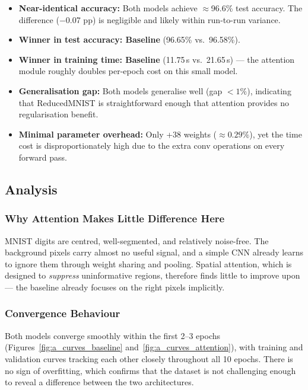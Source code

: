\documentclass[12pt,a4paper]{article}
\begin{document}
\begin{itemize}[leftmargin=1.5em]
    \item \textbf{Near-identical accuracy:} Both models achieve $\approx$96.6\%
          test accuracy. The difference ($-$0.07 pp) is negligible and likely within
          run-to-run variance.
    \item \textbf{Winner in test accuracy: Baseline} (96.65\% vs.\ 96.58\%).
    \item \textbf{Winner in training time: Baseline} (11.75\,s vs.\ 21.65\,s) —
          the attention module roughly doubles per-epoch cost on this small model.
    \item \textbf{Generalisation gap:} Both models generalise well (gap $<1\%$),
          indicating that ReducedMNIST is straightforward enough that attention
          provides no regularisation benefit.
    \item \textbf{Minimal parameter overhead:} Only +38 weights ($\approx0.29\%$),
          yet the time cost is disproportionately high due to the extra conv operations
          on every forward pass.
\end{itemize}

\subsection{Analysis}

\subsubsection{Why Attention Makes Little Difference Here}

MNIST digits are centred, well-segmented, and relatively noise-free. The background
pixels carry almost no useful signal, and a simple CNN already learns to ignore them
through weight sharing and pooling. Spatial attention, which is designed to
\emph{suppress} uninformative regions, therefore finds little to improve upon —
the baseline already focuses on the right pixels implicitly.

\subsubsection{Convergence Behaviour}

Both models converge smoothly within the first 2--3 epochs
(Figures~\ref{fig:a_curves_baseline} and~\ref{fig:a_curves_attention}), with training
and validation curves tracking each other closely throughout all 10 epochs. There is
no sign of overfitting, which confirms that the dataset is not challenging enough to
reveal a difference between the two architectures.
\end{document}
